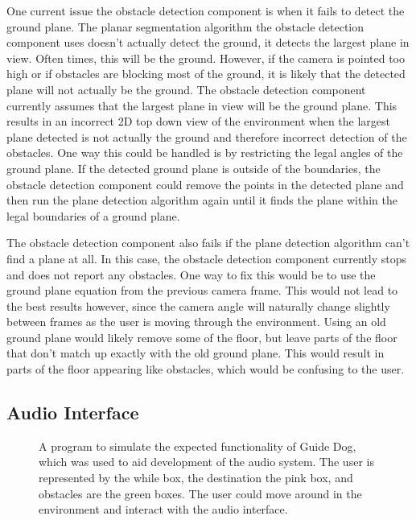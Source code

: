 One current issue the obstacle detection component is when it fails to
detect the ground plane. The planar segmentation algorithm the obstacle
detection component uses doesn't actually detect the ground, it detects the
largest plane in view. Often times, this will be the ground. However, if the
camera is pointed too high or if obstacles are blocking most of the ground, it is
likely that the detected plane will not actually be the ground. The obstacle
detection component currently assumes that the largest plane in view will be the
ground plane. This results in an incorrect 2D top down view of the environment
when the largest plane detected is not actually the ground and therefore
incorrect detection of the obstacles. One way this could be handled is by
restricting the legal angles of the ground plane. If the detected ground plane
is outside of the boundaries, the obstacle detection component could remove the
points in the detected plane and then run the plane detection algorithm again
until it finds the plane within the legal boundaries of a ground plane.

The obstacle detection component also fails if the plane detection algorithm
can't find a plane at all. In this case, the obstacle detection component
currently stops and does not report any obstacles. One way to fix this would be
to use the ground plane equation from the previous camera frame. This would not
lead to the best results however, since the camera angle will naturally change
slightly between frames as the user is moving through the environment. Using an
old ground plane would likely remove some of the floor, but leave parts of the
floor that don't match up exactly with the old ground plane. This would result
in parts of the floor appearing like obstacles, which would be confusing to the
user.


\subsection{Audio Interface}
\label{sec:eval-audio}

\begin{figure}
\caption{A program to simulate the expected functionality of Guide Dog, which
was used to aid development of the audio system. The user is represented by the
while box, the destination the pink box, and obstacles are the green boxes. The
user could move around in the environment and interact with the audio
interface.}
\label{fig:vsim}
\end{figure}


